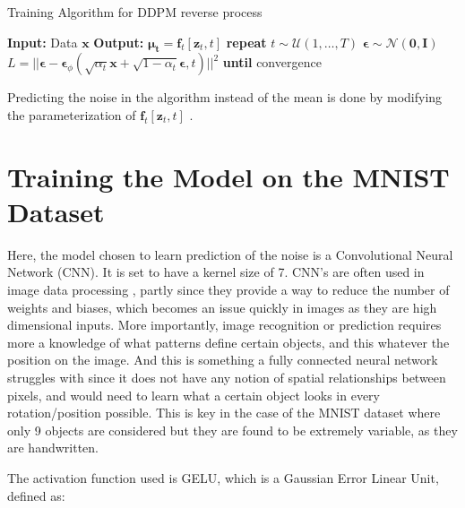 \documentclass[12pt]{report} %
\begin{document}
\begin{definitionbox}{Training Algorithm for DDPM reverse process \cite{ho2020denoising}}
  \begin{algorithmic}
    \State \textbf{Input:} Data $\mathbf{x}$
    \State \textbf{Output:} $\mathbf{\mu_{t}} = \mathbf{f}_{t}[\mathbf{z}_{t},t]$
    \State \textbf{repeat}
       
        \State $t \sim \mathcal{U}(1, \dots, T)$ 
        \State $\mathbf{\epsilon} \sim \mathcal{N}(\mathbf{0}, \mathbf{I})$ 
        \State $L = ||\mathbf{\epsilon} - \mathbf{\epsilon}_{\phi}(\sqrt{\alpha_{t}}\mathbf{x} + \sqrt{1 - \alpha_{t}}\mathbf{\epsilon}, t)||^{2}$ 
      \EndFor {}
    \State \textbf{until} convergence
  \end{algorithmic}
\end{definitionbox}

Predicting the noise in the algorithm instead of the mean is done by modifying the parameterization of $\mathbf{f}_{t}[\mathbf{z}_{t}, t]$ \cite{ho2020denoising}.

\section{Training the Model on the MNIST Dataset}

Here, the model chosen to learn prediction of the noise is a Convolutional Neural Network (CNN). It is set to have a kernel size of 7. CNN's are often used in image data processing \cite[p.161]{prince2023understanding}, partly since they provide a way to reduce the number of weights and biases, which becomes an issue quickly in images as they are high dimensional inputs. More importantly, image recognition or prediction requires more a knowledge of what patterns define certain objects, and this whatever the position on the image. And this is something a fully connected neural network struggles with since it does not have any notion of spatial relationships between pixels, and would need to learn what a certain object looks in every rotation/position possible. This is key in the case of the MNIST dataset where only 9 objects are considered but they are found to be extremely variable, as they are handwritten.

The activation function used is GELU, which is a Gaussian Error Linear Unit, defined as:
\end{document}
